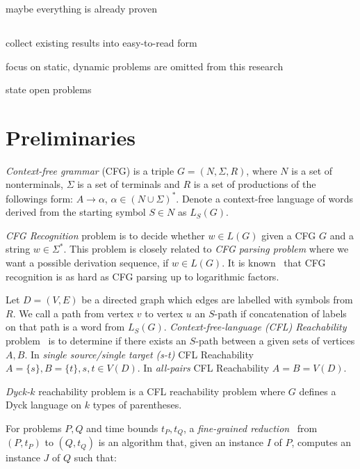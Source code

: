\documentclass[acmsmall,review,nonacm]{acmart}\settopmatter{printfolios=true,printccs=false,printacmref=false}
\begin{document}
	maybe everything is already proven
	
	\subsection{}
	
	collect existing results into easy-to-read form
	
	focus on static, dynamic problems are omitted from this research
	
	state open problems
	
	\section{Preliminaries}
	
	\emph{Context-free grammar} (CFG) is a triple $G=(N, \Sigma, R)$, where $N$ is a set of nonterminals, $\Sigma$ is a set of terminals and $R$ is a set of productions of the followings form: $A \to \alpha$, $\alpha \in (N \cup \Sigma)^*$. Denote a context-free language of words derived from the starting symbol $S \in N$ as $L_S(G)$.
	
	\emph{CFG Recognition} problem is to decide whether $w \in L(G)$ given a CFG $G$ and a string $w \in \Sigma^*$. This problem is closely related to \emph{CFG parsing problem} where we want a possible derivation sequence, if $w \in L(G)$. It is known~\cite{10.5555/646233.682379} that CFG recognition is as hard as CFG parsing up to logarithmic factors.
		
	Let $D = (V, E)$ be a directed graph which edges are labelled with symbols from $R$. We call a path from vertex $v$ to vertex $u$ an $S$-path if concatenation of labels on that path is a word from $L_S(G)$.  \emph{Context-free-language (CFL) Reachability} problem~\cite{10.1145/258994.259006} is to determine if there exists an $S$-path between a given sets of vertices $A, B$. In \emph{single source/single target (s-t)} CFL Reachability $A = \{s\}, B = \{t\}, s, t \in V(D)$. In \emph{all-pairs} CFL Reachability $A = B = V(D)$.
	
	\emph{Dyck-$k$} reachability problem is a CFL reachability problem where $G$ defines a Dyck language on $k$ types of parentheses.
	
	For problems $P, Q$ and time bounds $t_P, t_Q$, a \emph{fine-grained reduction}~\cite{bringmann2019fine} from $(P, t_P)$ to $(Q, t_Q)$ is an algorithm that, given an instance $I$ of $P$, computes an instance $J$ of $Q$ such that: 
	
\end{document}
